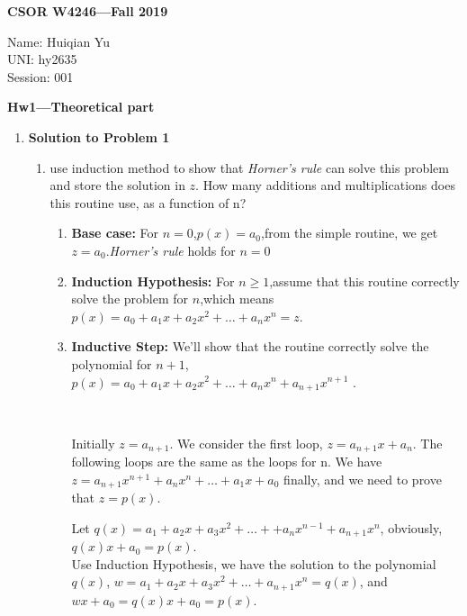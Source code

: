 \documentclass[11pt]{article}
\begin{document}
\begin{flushright}
{\bf CSOR W4246---Fall 2019}
\end{flushright}
\begin{flushleft}
Name: Huiqian Yu\\
UNI: hy2635\\
Session: 001\\

\end{flushleft}

\bigskip
\centerline{\bf Hw1---Theoretical part}

\bigskip 

\begin{enumerate}
	\item  \textbf{Solution to Problem 1}
	\begin{enumerate}
	\item use induction method to show that \textit{Horner's rule} can solve this problem and store the solution in $z$. How many additions and multiplications does this routine use, as a function of n?
    
    
	\begin{enumerate}
	\item \textbf{Base case:} 
    For $n=0$,$p(x)=a_0$,from the simple routine, we get $z=a_0$.\textit{Horner's rule} holds for $n=0$
	\item \textbf{Induction Hypothesis:} For $n \geq 1$,assume that this routine correctly solve the problem for $n$,which means $p(x)=a_0+a_1x+a_2x^2+\dots+a_nx^n=z$.
	\item \textbf{Inductive Step:} We'll show that the routine correctly solve the polynomial for $n+1$, $p(x)=a_0+a_1x+a_2x^2+\dots+a_nx^n+a_{n+1}x^{n+1}$ .
	
	    \
	
	    Initially $z=a_{n+1}$. We consider the first loop, $z=a_{n+1}x+a_n$. The following loops are the same as the loops for n. We have $z=a_{n+1}x^{n+1}+a_nx^n+\dots+a_1x+a_0$ finally, and we need to prove that $z=p(x)$.
	    \
	  	    
	    Let $q(x)=a_1+a_2x+a_3x^2+\dots++a_nx^{n-1}+a_{n+1}x^n$, obviously, $q(x)x+a_0=p(x)$.
	    \\
	    
	    Use Induction Hypothesis, we have the solution to the polynomial $q(x)$, $w=a_1+a_2x+a_3x^2+\dots+a_{n+1}x^n=q(x)$, and $wx+a_0=q(x)x+a_0=p(x)$.
	    
	    \
	    

\end{enumerate}
\end{enumerate}
\end{enumerate}
\end{document}
